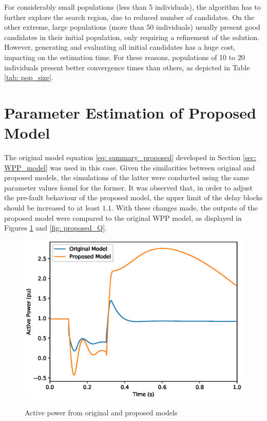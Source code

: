 For considerably small populations (less than 5 individuals), the algorithm has to further explore the search region, due to reduced number of candidates. On the other extreme, large populations (more than 50 individuals) usually present good candidates in their initial population, only requiring a refinement of the solution. However, generating and evaluating all initial candidates has a huge cost, impacting on the estimation time. For these reasons, populations of 10 to 20 individuals present better convergence times than others, as depicted in Table \ref{tab: pop_size}.

\section{Parameter Estimation of Proposed Model}

The original model equation \eqref{eq: summary_proposed} developed in Section \ref{sec: WPP_model} was used in this case. Given the similarities between original and proposed models, the simulations of the latter were conducted using the same parameter values found for the former. It was observed that, in order to adjust the pre-fault behaviour of the proposed model, the upper limit of the delay blocks should be increased to at least $1.1$. With these changes made, the outputs of the proposed model were compared to the original WPP model, as displayed in Figures \ref{fig: proposed_P} and \ref{fig: proposed_Q}.

\begin{figure}[!h]
	\centering
	\caption{Active power from original and proposed models}
	\includegraphics[scale=.7]{Images/P_proposed.eps}
	\label{fig: proposed_P}
\end{figure}

